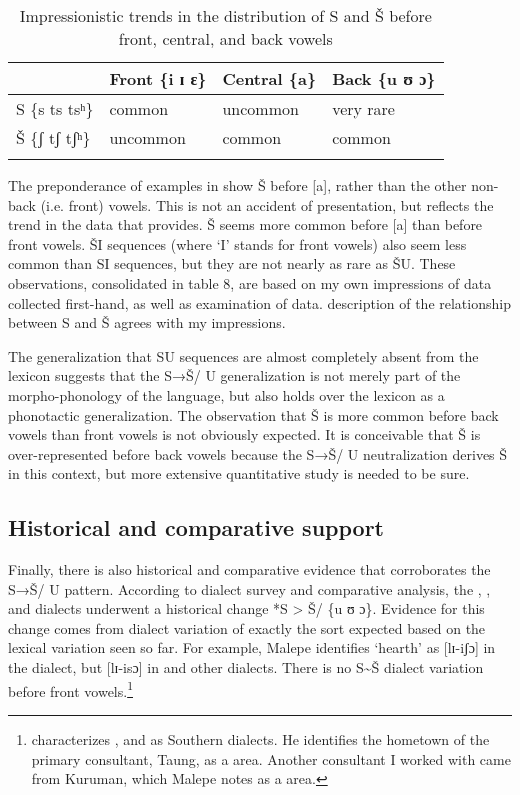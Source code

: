 \begin{table}[p]
\begin{tabularx}{\textwidth}{XXXX}
\lsptoprule
& Front \{i ɪ ɛ\} & Central \{a\} & Back \{u ʊ ɔ\}\\
\midrule
S \{s ts tsʰ\} & common & uncommon & very rare\\
Š \{ʃ tʃ tʃʰ\} & uncommon & common & common\\
\lspbottomrule
\end{tabularx}
\caption{Impressionistic trends in the distribution of S and Š before front, central, and back vowels}
\label{tab:bennett:8}
\end{table}

The preponderance of examples in  show Š before [a], rather than the other non-back (i.e. front) vowels. This is not an accident of presentation, but reflects the trend in the data that \citet{Cole1955} provides. Š seems more common before [a] than before front vowels. ŠI sequences (where ‘I’ stands for front vowels) also seem less common than SI sequences, but they are not nearly as rare as ŠU. These observations, consolidated in table 8, are based on my own impressions of data collected first-hand, as well as examination of  data.  description of the relationship between S and Š agrees with my impressions.



The generalization that SU sequences are almost completely absent from the lexicon suggests that the S→Š/ {\longrule} U generalization is not merely part of the morpho-phonology of the language, but also holds over the lexicon as a phonotactic generalization. The observation that Š is more common before back vowels than front vowels is not obviously expected. It is conceivable that Š is over-represented before back vowels because the S→Š/ {\longrule} U neutralization derives Š in this context, but more extensive quantitative study is needed to be sure.

\subsection{Historical and comparative support}\label{sec:bennett:2.6}

Finally, there is also historical and comparative evidence that corroborates the S→Š/ {\longrule} U pattern. According to  dialect survey and comparative analysis, the , , and  dialects underwent a historical change *S > Š/ {\longrule} \{u ʊ ɔ\}. Evidence for this change comes from dialect variation of exactly the sort expected based on the lexical variation seen so far. For example, Malepe identifies ‘hearth’ as [lɪ-iʃɔ] in the  dialect, but [lɪ-isɔ] in  and other dialects. There is no S{\textasciitilde}Š dialect variation before front vowels.\footnote{\citet{Malepe1966} characterizes ,  and  as Southern dialects. He identifies the hometown of the primary consultant, Taung, as a  area. Another consultant I worked with came from Kuruman, which Malepe notes as a  area.}

